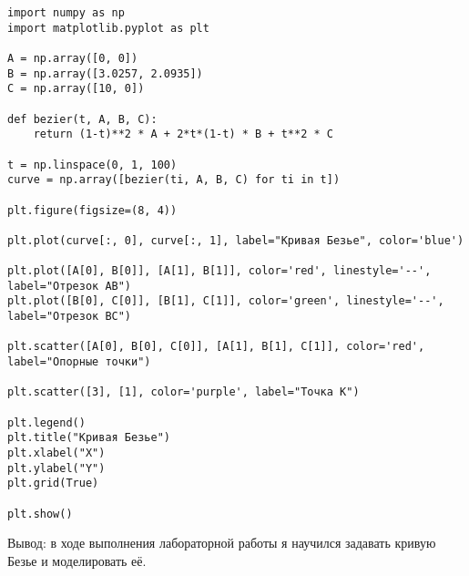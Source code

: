 \begin{verbatim}
import numpy as np
import matplotlib.pyplot as plt

A = np.array([0, 0])
B = np.array([3.0257, 2.0935])
C = np.array([10, 0])

def bezier(t, A, B, C):
    return (1-t)**2 * A + 2*t*(1-t) * B + t**2 * C

t = np.linspace(0, 1, 100)
curve = np.array([bezier(ti, A, B, C) for ti in t])

plt.figure(figsize=(8, 4))

plt.plot(curve[:, 0], curve[:, 1], label="Кривая Безье", color='blue')

plt.plot([A[0], B[0]], [A[1], B[1]], color='red', linestyle='--', label="Отрезок AB")
plt.plot([B[0], C[0]], [B[1], C[1]], color='green', linestyle='--', label="Отрезок BC")

plt.scatter([A[0], B[0], C[0]], [A[1], B[1], C[1]], color='red', label="Опорные точки")

plt.scatter([3], [1], color='purple', label="Точка K")

plt.legend()
plt.title("Кривая Безье")
plt.xlabel("X")
plt.ylabel("Y")
plt.grid(True)

plt.show()
\end{verbatim}
\noindent Вывод: в ходе выполнения лабораторной работы я научился задавать кривую Безье и моделировать её.
